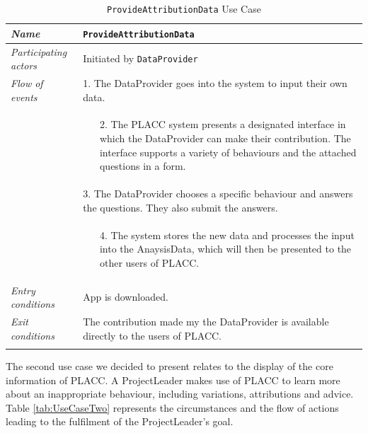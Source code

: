 \begin{longtable}[ht]{ p{}  p{} }
\caption{\texttt{ProvideAttributionData} Use Case}
\label{tab:UseCase}\\
\hline
\textit{Name} &  \texttt{ProvideAttributionData} \\
    \hline
   \textit{Participating actors} & Initiated by \texttt{DataProvider} \\
   \hline
   \textit{Flow of events} &  1.  The DataProvider goes into the system to input their own data. \\
   & \vspace{-1.5pc}\begin{enumerate}
   \item [2.]  The PLACC system presents a designated interface in which the DataProvider can make their contribution.  The interface supports a variety of behaviours and the attached questions in a form.  
   \end{enumerate} \\
   & 3.  The DataProvider chooses a specific behaviour and answers the questions. They also submit the answers.  \\
   & \vspace{-1.5pc}\begin{enumerate}
   \item [4.] The system stores the new data and processes the input into the AnaysisData, which will then be presented to the other users of PLACC.
   \end{enumerate} \\
   \hline
    \textit{Entry conditions} &  App is downloaded. \\
    \hline
     \textit{Exit conditions} &  The contribution made my the DataProvider is available directly to the users of PLACC. \\
      \hline
\label{tab:multicol}
\end{longtable}

The second use case we decided to present relates to the display of the core information of PLACC.  A ProjectLeader makes use of PLACC to learn more about an inappropriate behaviour, including variations, attributions and advice.  Table \ref{tab:UseCaseTwo} represents the circumstances and the flow of actions leading to the fulfilment of the ProjectLeader's goal.

